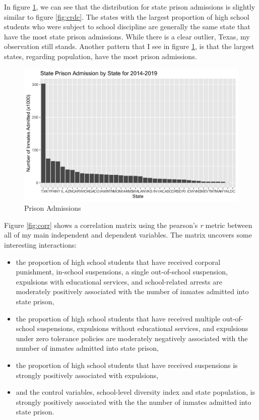 \documentclass[12pt]{article}
\begin{document}
In figure \ref{fig:ncrp}, we can see that the distribution for state prison admissions is slightly similar to figure \ref{fig:crdc}. The states with the largest proportion of high school students who were subject to school discipline are generally the same state that have the most state prison admissions. While there is a clear outlier, Texas, my observation still stands. Another pattern that I see in figure \ref{fig:ncrp}, is that the largest states, regarding population, have the most prison admissions. 

\begin{figure}[H]
  \centering
  \includegraphics[width = 12cm]{NCRP_bar.png}
  \caption{Prison Admissions}
  \label{fig:ncrp}
\end{figure}

Figure \ref{fig:corr} shows a correlation matrix using the pearson's \emph{r} metric between all of my main independent and dependent variables. The matrix uncovers some interesting interactions: 
\begin{itemize}
  \item the proportion of high school students that have received corporal punishment, in-school suspensions, a single out-of-school suspension, expulsions with educational services, and school-related arrests are moderately positively associated with the number of inmates admitted into state prison,
  \item the proportion of high school students that have received multiple out-of-school suspensions, expulsions without educational services, and expulsions under zero tolerance policies are moderately negatively associated with the number of inmates admitted into state prison,
  \item the proportion of high school students that have received suspensions is strongly positively associated with expulsions,
  \item and the control variables, school-level diversity index and state population, is strongly positively associated with the the number of inmates admitted into state prison.
\end{itemize}
\end{document}
